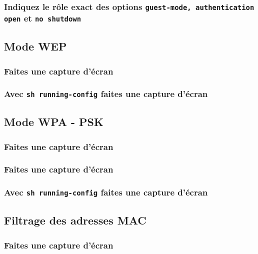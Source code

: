 \documentclass[12pt, a4paper]{article}
\begin{document}
        \subsubsection{Indiquez le rôle exact des options \texttt{guest-mode, authentication open} et \texttt{no shutdown}}

    \subsection{Mode WEP}

        \subsubsection{Faites une capture d'écran}

        \subsubsection{Avec \texttt{sh running-config} faites une capture d'écran}

    \subsection{Mode WPA - PSK}

        \subsubsection{Faites une capture d'écran}

        \subsubsection{Faites une capture d'écran}

        \subsubsection{Avec \texttt{sh running-config} faites une capture d'écran}

    \subsection{Filtrage des adresses MAC}

        \subsubsection{Faites une capture d'écran}
\end{document}
